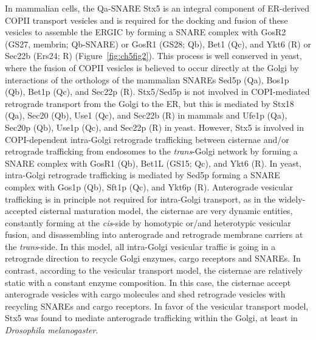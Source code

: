 In mammalian cells, the Qa-SNARE Stx5 is an integral component of ER-derived COPII transport vesicles and is required for the docking and fusion of these vesicles to assemble the ERGIC\cite{appenzeller-herzog_er-golgi_2006,bentley_snare_2006} by forming a SNARE complex with GosR2 (GS27, membrin; Qb-SNARE) or GosR1 (GS28; Qb), Bet1 (Qc), and Ykt6 (R) or Sec22b (Ers24; R) (Figure~\ref{fig:ch5fig2})\cite{xu_subunit_2000,zhang_ykt6_2001,dascher_syntaxin_1994,hay_mammalian_1996,hay_localization_1998,paek_ers-24_1997,zhang_mammalian_1997}. This process is well conserved in yeast, where the fusion of COPII vesicles is believed to occur directly at the Golgi\cite{barlowe_copii_1994} by interactions of the orthologs of the mammalian SNAREs Sed5p (Qa), Bos1p (Qb), Bet1p (Qc), and Sec22p (R)\cite{adolf_sec24c/d-isoformspecific_2016,newman_bet1_1990,sacher_synaptobrevin-related_1997}. Stx5/Sed5p is not involved in COPI-mediated retrograde transport from the Golgi to the ER, but this is mediated by Stx18 (Qa), Sec20 (Qb), Use1 (Qc), and Sec22b (R) in mammals and Ufe1p (Qa), Sec20p (Qb), Use1p (Qc), and Sec22p (R) in yeast\cite{malsam_organization_2011,burri_snare_2003,dilcher_use1p_2003}. However, Stx5 is involved in COPI-dependent intra-Golgi retrograde trafficking between cisternae and/or retrograde trafficking from endosomes to the \emph{trans}-Golgi network by forming a SNARE complex with GosR1 (Qb), Bet1L (GS15; Qc), and Ykt6 (R)\cite{malsam_organization_2011,zhang_ykt6_2001,hay_localization_1998,xu_gs15_2002,volchuk_countercurrent_2004,tai_participation_2004}. In yeast, intra-Golgi retrograde trafficking is mediated by Sed5p forming a SNARE complex with Gos1p (Qb), Sft1p (Qc), and Ykt6p (R)\cite{malsam_organization_2011,parlati_distinct_2002,banfield_snare-like_1995}. Anterograde vesicular trafficking is in principle not required for intra-Golgi transport, as in the widely-accepted cisternal maturation model, the cisternae are very dynamic entities, constantly forming at the \emph{cis}-side by homotypic or/and heterotypic vesicular fusion, and disassembling into anterograde and retrograde membrane carriers at the \emph{trans}-side\cite{cottam_retrograde_2012}. In this model, all intra-Golgi vesicular traffic is going in a retrograde direction to recycle Golgi enzymes, cargo receptors and SNAREs\cite{cottam_retrograde_2012}. In contrast, according to the vesicular transport model, the cisternae are relatively static with a constant enzyme composition. In this case, the cisternae accept anterograde vesicles with cargo molecules and shed retrograde vesicles with recycling SNAREs and cargo receptors\cite{cottam_retrograde_2012}. In favor of the vesicular transport model, Stx5 was found to mediate anterograde trafficking within the Golgi, at least in \emph{Drosophila melanogaster}\cite{satoh_roles_2016}. 

